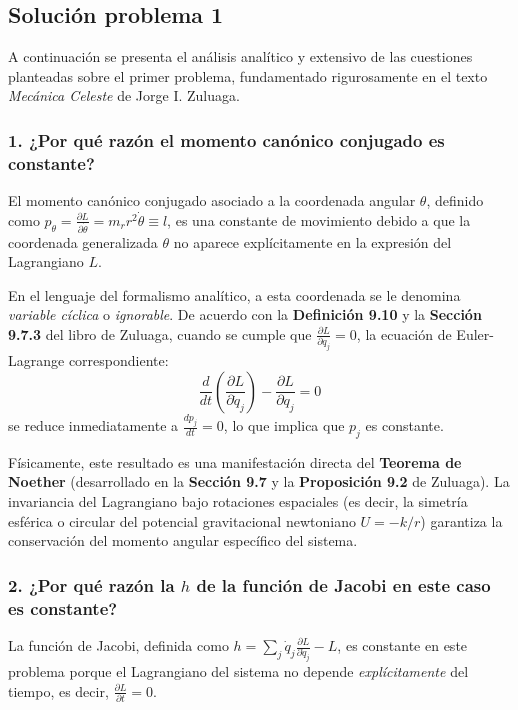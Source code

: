 \documentclass[a4paper]{article}
\begin{document}
\subsection{Solución problema 1}

A continuación se presenta el análisis analítico y extensivo de las cuestiones planteadas sobre el primer problema, fundamentado rigurosamente en el texto \textit{Mecánica Celeste} de Jorge I. Zuluaga.

\subsubsection*{1. ¿Por qué razón el momento canónico conjugado es constante?}
El momento canónico conjugado asociado a la coordenada angular $\theta$, definido como $p_\theta = \frac{\partial L}{\partial \dot{\theta}} = m_r r^2 \dot{\theta} \equiv l$, es una constante de movimiento debido a que la coordenada generalizada $\theta$ no aparece explícitamente en la expresión del Lagrangiano $L$. 

En el lenguaje del formalismo analítico, a esta coordenada se le denomina \textit{variable cíclica} o \textit{ignorable}. De acuerdo con la \textbf{Definición 9.10} y la \textbf{Sección 9.7.3} del libro de Zuluaga, cuando se cumple que $\frac{\partial L}{\partial q_j} = 0$, la ecuación de Euler-Lagrange correspondiente:
$$ \frac{d}{dt}\left(\frac{\partial L}{\partial \dot{q}_j}\right) - \frac{\partial L}{\partial q_j} = 0 $$
se reduce inmediatamente a $\frac{d p_j}{dt} = 0$, lo que implica que $p_j$ es constante. 

Físicamente, este resultado es una manifestación directa del \textbf{Teorema de Noether} (desarrollado en la \textbf{Sección 9.7} y la \textbf{Proposición 9.2} de Zuluaga). La invariancia del Lagrangiano bajo rotaciones espaciales (es decir, la simetría esférica o circular del potencial gravitacional newtoniano $U = -k/r$) garantiza la conservación del momento angular específico del sistema.

\subsubsection*{2. ¿Por qué razón la $h$ de la función de Jacobi en este caso es constante?}
La función de Jacobi, definida como $h = \sum_j \dot{q}_j \frac{\partial L}{\partial \dot{q}_j} - L$, es constante en este problema porque el Lagrangiano del sistema no depende \textit{explícitamente} del tiempo, es decir, $\frac{\partial L}{\partial t} = 0$. 
\end{document}
